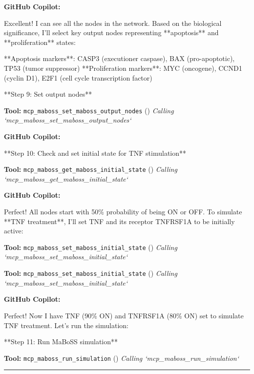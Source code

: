 \documentclass[11pt,a4paper]{article}
\begin{document}
\begin{copilotbox}
\textbf{GitHub Copilot:}

Excellent! I can see all the nodes in the network. Based on the biological significance, I'll select key output nodes representing **apoptosis** and **proliferation** states:

**Apoptosis markers**: CASP3 (executioner caspase), BAX (pro-apoptotic), TP53 (tumor suppressor)  
**Proliferation markers**: MYC (oncogene), CCND1 (cyclin D1), E2F1 (cell cycle transcription factor)

**Step 9: Set output nodes**

\end{copilotbox}
\begin{toolokbox}
\textbf{Tool:} \texttt{mcp\_maboss\_set\_maboss\_output\_nodes} (\checkmark)
\textit{Calling `mcp\_maboss\_set\_maboss\_output\_nodes`}
\end{toolokbox}
\begin{copilotbox}
\textbf{GitHub Copilot:}

**Step 10: Check and set initial state for TNF stimulation**

\end{copilotbox}
\begin{toolokbox}
\textbf{Tool:} \texttt{mcp\_maboss\_get\_maboss\_initial\_state} (\checkmark)
\textit{Calling `mcp\_maboss\_get\_maboss\_initial\_state`}
\end{toolokbox}
\begin{copilotbox}
\textbf{GitHub Copilot:}

Perfect! All nodes start with 50\% probability of being ON or OFF. To simulate **TNF treatment**, I'll set TNF and its receptor TNFRSF1A to be initially active:

\end{copilotbox}
\begin{toolokbox}
\textbf{Tool:} \texttt{mcp\_maboss\_set\_maboss\_initial\_state} (\checkmark)
\textit{Calling `mcp\_maboss\_set\_maboss\_initial\_state`}
\end{toolokbox}
\begin{toolokbox}
\textbf{Tool:} \texttt{mcp\_maboss\_set\_maboss\_initial\_state} (\checkmark)
\textit{Calling `mcp\_maboss\_set\_maboss\_initial\_state`}
\end{toolokbox}
\begin{copilotbox}
\textbf{GitHub Copilot:}

Perfect! Now I have TNF (90\% ON) and TNFRSF1A (80\% ON) set to simulate TNF treatment. Let's run the simulation:

**Step 11: Run MaBoSS simulation**

\end{copilotbox}
\begin{toolokbox}
\textbf{Tool:} \texttt{mcp\_maboss\_run\_simulation} (\checkmark)
\textit{Calling `mcp\_maboss\_run\_simulation`}
\end{toolokbox}
\bigskip\hrule\bigskip
\end{document}
